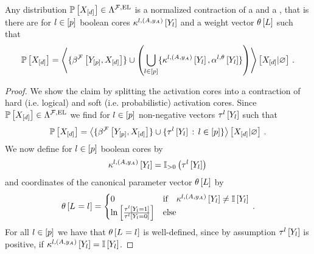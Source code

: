 \begin{theorem}
    \label{the:hybridNetworkRepresentation}
    Any distribution $\mathbb{P}\left[X_{[d]}\right]\in\Lambda^{\mathcal{F},\mathrm{EL}}$ is a normalized contraction of a \HardLogicNetwork{} and a \MarkovLogicNetwork{}, that is there are for $l\in[p]$ boolean cores $\kappa^{l,(A,y_{A})}\left[Y_{l}\right]$ and a weight vector $\theta\left[L\right]$ such that
    \begin{align*}
        \mathbb{P}\left[X_{[d]}\right] =
        \left\langle 
            \{\beta^{\mathcal{F}}\left[Y_{[p]},X_{[d]}\right]\}
            \cup \left(\bigcup_{l\in[p]}\{\kappa^{l,(A,y_{A})}\left[Y_{l}\right],\alpha^{l,\theta}\left[Y_{l}\right]\}\right)
        \right\rangle \left[ X_{[d]} | \varnothing \right] \, .
    \end{align*}
\end{theorem}
\begin{proof}
    We show the claim by splitting the activation cores into a contraction of hard (i.e. logical) and soft (i.e. probabilistic) activation cores.
    Since $\mathbb{P}\left[X_{[d]}\right]\in\Lambda^{\mathcal{F},\mathrm{EL}}$ we find for $l\in[p]$ non-negative vectors $\tau^{l}\left[Y_{l}\right]$ such that
    \begin{align*}
        \mathbb{P}\left[X_{[d]}\right] =
        \left\langle 
            \{\beta^{\mathcal{F}}\left[Y_{[p]},X_{[d]}\right]\}
            \cup \{\tau^{l}\left[Y_{l}\right]\,:\,l\in[p]\}
        \right\rangle \left[ X_{[d]} | \varnothing \right] \, .
    \end{align*}
    We now define for $l\in[p]$ boolean cores by
    \begin{align*}
        \kappa^{l,(A,y_{A})}\left[Y_{l}\right] =
        \mathbb{I}_{>0}\left(\tau^{l}\left[Y_{l}\right]\right) \,
    \end{align*}
    and coordinates of the canonical parameter vector $\theta\left[L\right]$ by
    \begin{align*}
        \theta\left[L_{}=l_{}\right] =
        \begin{cases}
            0 & \text{if}\quad \kappa^{l,(A,y_{A})}\left[Y_{l}\right]\neq\mathbb{I}\left[Y_{l}\right] \\
            \ln \left[ \frac{\tau^{l}\left[Y_{l}=1\right]}{\tau^{l}\left[Y_{l}=0\right]} \right] & \text{else} \\
        \end{cases} \, .
    \end{align*}
    For all $l\in[p]$ we have that $\theta\left[L_{}=l_{}\right]$ is well-defined, since by assumption $\tau^{l}\left[Y_{l}\right]$ is positive, if $\kappa^{l,(A,y_{A})}\left[Y_{l}\right]=\mathbb{I}\left[Y_{l}\right]$.

\end{proof}
